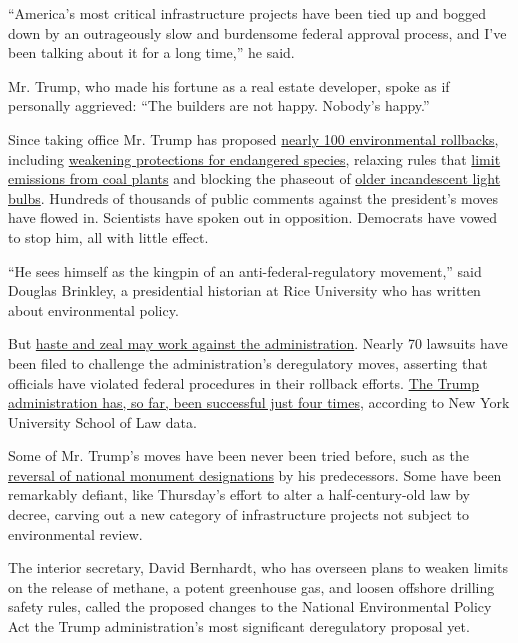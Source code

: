 ``America's most critical infrastructure projects have been tied up and
bogged down by an outrageously slow and burdensome federal approval
process, and I've been talking about it for a long time,'' he said.

Mr. Trump, who made his fortune as a real estate developer, spoke as if
personally aggrieved: ``The builders are not happy. Nobody's happy.''

Since taking office Mr. Trump has proposed
\href{https://www.nytimes3xbfgragh.onion/interactive/2019/climate/trump-environment-rollbacks.html}{nearly
100 environmental rollbacks}, including
\href{https://www.nytimes3xbfgragh.onion/2019/08/12/climate/endangered-species-act-changes.html}{weakening
protections for endangered species}, relaxing rules that
\href{https://www.nytimes3xbfgragh.onion/2019/06/19/climate/epa-coal-emissions.html}{limit
emissions from coal plants} and blocking the phaseout of
\href{https://www.nytimes3xbfgragh.onion/2019/09/04/climate/trump-light-bulb-rollback.html}{older
incandescent light bulbs}. Hundreds of thousands of public comments
against the president's moves have flowed in. Scientists have spoken out
in opposition. Democrats have vowed to stop him, all with little effect.

``He sees himself as the kingpin of an anti-federal-regulatory
movement,'' said Douglas Brinkley, a presidential historian at Rice
University who has written about environmental policy.

But
\href{https://www.nytimes3xbfgragh.onion/2018/04/07/climate/scott-pruitt-epa-rollbacks.html}{haste
and zeal may work against the administration}. Nearly 70 lawsuits have
been filed to challenge the administration's deregulatory moves,
asserting that officials have violated federal procedures in their
rollback efforts.
\href{https://policyintegrity.org/trump-court-roundup}{The Trump
administration has, so far, been successful just four times}, according
to New York University School of Law data.

Some of Mr. Trump's moves have been never been tried before, such as the
\href{https://www.nytimes3xbfgragh.onion/2017/12/04/us/trump-bears-ears.html}{reversal
of national monument designations} by his predecessors. Some have been
remarkably defiant, like Thursday's effort to alter a half-century-old
law by decree, carving out a new category of infrastructure projects not
subject to environmental review.

The interior secretary, David Bernhardt, who has overseen plans to
weaken limits on the release of methane, a potent greenhouse gas, and
loosen offshore drilling safety rules, called the proposed changes to
the National Environmental Policy Act the Trump administration's most
significant deregulatory proposal yet.

